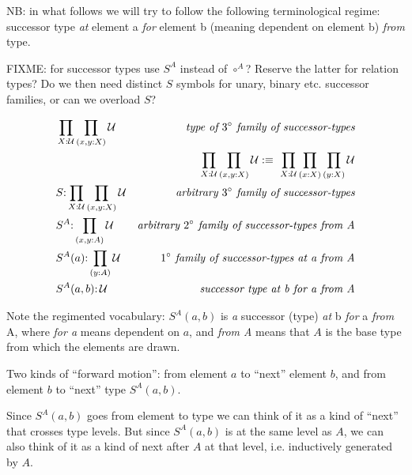 \documentclass{article}
\begin{document}
NB: in what follows we will try to follow the following terminological
regime: successor type \emph{at} element a \emph{for} element b
(meaning dependent on element b) \emph{from} type.

\begin{remark}
  FIXME: for successor types use \(S^A\) instead of \(\circ^A\)?
  Reserve the latter for relation types?  Do we then need distinct
  \(S\) symbols for unary, binary etc. successor families, or can we
  overload \(S\)?
\end{remark}

\begin{align}
  & \prod\limits_{X:\mathcal{U}}\prod\limits_{(x,y:X)}\mathcal{U} & \textit{type of \(3^{\circ}\) family of successor-types} \\
  && \prod\limits_{X:\mathcal{U}}\prod\limits_{(x,y:X)}\mathcal{U}:\equiv\ \prod\limits_{X:\mathcal{U}}\prod\limits_{(x:X)}\prod\limits_{(y:X)}\mathcal{U} \notag \\
  & S{:}\prod\limits_{X:\mathcal{U}}\prod\limits_{(x,y:X)}\mathcal{U} & \textit{arbitrary \(3^{\circ}\) family of successor-types} \\
  & S^A{:}\prod\limits_{(x,y:A)}\mathcal{U} & \textit{arbitrary \(2^{\circ}\) family of successor-types from A}\\
  & S^A(a){:}\prod\limits_{(y:A)}\mathcal{U} & \textit{\(1^{\circ}\) family of successor-types at a from A} \\
  & S^A(a, b){:}\,\mathcal{U} & \textit{successor type at b for a from A} \\
\end{align}

Note the regimented vocabulary: \(S^A(a,b)\) is \emph{a} successor
(type) \emph{at} b \emph{for} a \emph{from} A, where \emph{for a}
means dependent on \(a\), and \emph{from A} means that \(A\) is the
base type from which the elements are drawn.

\begin{remark}
  Two kinds of ``forward motion'': from element \(a\) to ``next''
  element \(b\), and from element \(b\) to ``next'' type \(S^A(a,b)\).
\end{remark}

\begin{remark}
  Since \(S^A(a,b)\) goes from element to type we can think of it as a
  kind of ``next'' that crosses type levels.  But since \(S^A(a,b)\)
  is at the same level as \(A\), we can also think of it as a kind of
  next after \(A\) at that level, i.e. inductively generated by \(A\).
\end{remark}
\end{document}
